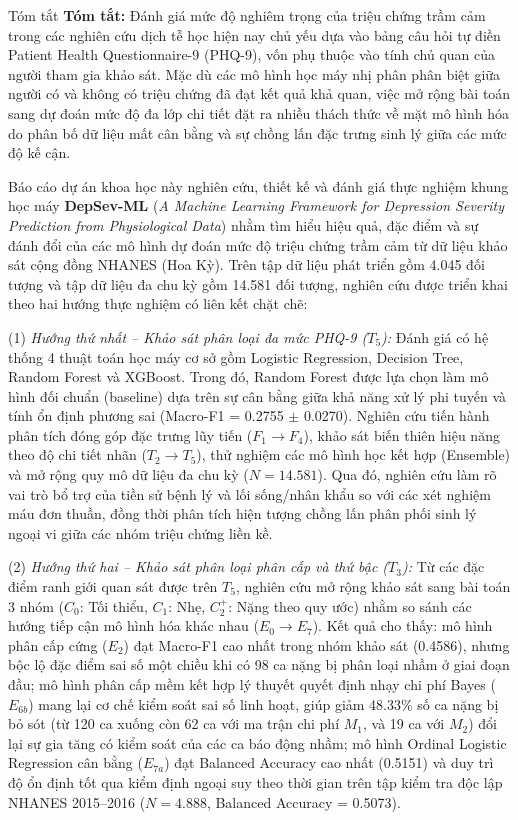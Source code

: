 \documentclass{uetgraduation}
\begin{document}
\begin{preamble}{Tóm tắt}
\textbf{Tóm tắt:} Đánh giá mức độ nghiêm trọng của triệu chứng trầm cảm trong các nghiên cứu dịch tễ học hiện nay chủ yếu dựa vào bảng câu hỏi tự điền Patient Health Questionnaire-9 (PHQ-9), vốn phụ thuộc vào tính chủ quan của người tham gia khảo sát. Mặc dù các mô hình học máy nhị phân phân biệt giữa người có và không có triệu chứng đã đạt kết quả khả quan, việc mở rộng bài toán sang dự đoán mức độ đa lớp chi tiết đặt ra nhiều thách thức về mặt mô hình hóa do phân bố dữ liệu mất cân bằng và sự chồng lấn đặc trưng sinh lý giữa các mức độ kế cận.

Báo cáo dự án khoa học này nghiên cứu, thiết kế và đánh giá thực nghiệm khung học máy \textbf{DepSev-ML} (\textit{A Machine Learning Framework for Depression Severity Prediction from Physiological Data}) nhằm tìm hiểu hiệu quả, đặc điểm và sự đánh đổi của các mô hình dự đoán mức độ triệu chứng trầm cảm từ dữ liệu khảo sát cộng đồng NHANES (Hoa Kỳ). Trên tập dữ liệu phát triển gồm 4.045 đối tượng và tập dữ liệu đa chu kỳ gồm 14.581 đối tượng, nghiên cứu được triển khai theo hai hướng thực nghiệm có liên kết chặt chẽ:

(1) \textit{Hướng thứ nhất -- Khảo sát phân loại đa mức PHQ-9 ($T_5$):} Đánh giá có hệ thống 4 thuật toán học máy cơ sở gồm Logistic Regression, Decision Tree, Random Forest và XGBoost. Trong đó, Random Forest được lựa chọn làm mô hình đối chuẩn (baseline) dựa trên sự cân bằng giữa khả năng xử lý phi tuyến và tính ổn định phương sai (Macro-F1 = 0.2755 $\pm$ 0.0270). Nghiên cứu tiến hành phân tích đóng góp đặc trưng lũy tiến ($F_1 \to F_4$), khảo sát biến thiên hiệu năng theo độ chi tiết nhãn ($T_2 \to T_5$), thử nghiệm các mô hình học kết hợp (Ensemble) và mở rộng quy mô dữ liệu đa chu kỳ ($N = 14.581$). Qua đó, nghiên cứu làm rõ vai trò bổ trợ của tiền sử bệnh lý và lối sống/nhân khẩu so với các xét nghiệm máu đơn thuần, đồng thời phân tích hiện tượng chồng lấn phân phối sinh lý ngoại vi giữa các nhóm triệu chứng liền kề.

(2) \textit{Hướng thứ hai -- Khảo sát phân loại phân cấp và thứ bậc ($T_3$):} Từ các đặc điểm ranh giới quan sát được trên $T_5$, nghiên cứu mở rộng khảo sát sang bài toán 3 nhóm ($C_0$: Tối thiểu, $C_1$: Nhẹ, $C_2^+$: Nặng theo quy ước) nhằm so sánh các hướng tiếp cận mô hình hóa khác nhau ($E_0 \to E_7$). Kết quả cho thấy: mô hình phân cấp cứng ($E_2$) đạt Macro-F1 cao nhất trong nhóm khảo sát (0.4586), nhưng bộc lộ đặc điểm sai số một chiều khi có 98 ca nặng bị phân loại nhầm ở giai đoạn đầu; mô hình phân cấp mềm kết hợp lý thuyết quyết định nhạy chi phí Bayes ($E_{6b}$) mang lại cơ chế kiểm soát sai số linh hoạt, giúp giảm 48.33\% số ca nặng bị bỏ sót (từ 120 ca xuống còn 62 ca với ma trận chi phí $M_1$, và 19 ca với $M_2$) đổi lại sự gia tăng có kiểm soát của các ca báo động nhầm; mô hình Ordinal Logistic Regression cân bằng ($E_{7a}$) đạt Balanced Accuracy cao nhất (0.5151) và duy trì độ ổn định tốt qua kiểm định ngoại suy theo thời gian trên tập kiểm tra độc lập NHANES 2015--2016 ($N = 4.888$, Balanced Accuracy = 0.5073).


\end{preamble}
\end{document}
